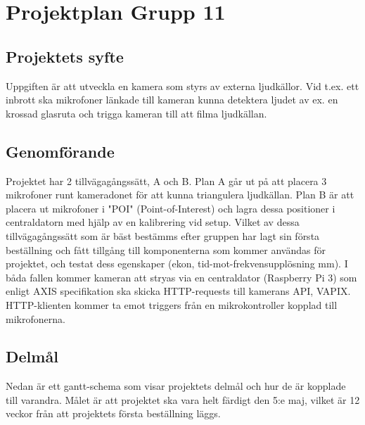 \documentclass[10pt]{article}
\begin{document}
\renewcommand\sfdefault{phv}
\renewcommand\mddefault{mc}
\renewcommand\bfdefault{bc}
\sffamily

\section*{\textbf{Projektplan Grupp 11}}

\subsection*{Projektets syfte}
Uppgiften är att utveckla en kamera som styrs av externa ljudkällor. Vid t.ex. ett inbrott ska mikrofoner länkade till kameran kunna detektera ljudet av
ex. en krossad glasruta och trigga kameran till att filma ljudkällan.
\subsection*{Genomförande}
Projektet har 2 tillvägagångssätt, A och B. Plan A går ut på att placera 3 mikrofoner runt kameradonet för att kunna triangulera ljudkällan.
Plan B är att placera ut mikrofoner i "POI" (Point-of-Interest) och lagra dessa positioner i centraldatorn med hjälp av en kalibrering vid setup.
Vilket av dessa tillvägagångssätt som är bäst bestämms efter gruppen har lagt sin första beställning och fått tillgång till komponenterna som kommer användas
för projektet, och testat dess egenskaper (ekon, tid-mot-frekvensupplösning mm). I båda fallen kommer kameran att stryas via en centraldator (Raspberry Pi 3)
som enligt AXIS specifikation ska skicka HTTP-requests till kamerans API, VAPIX. HTTP-klienten kommer ta emot triggers från en mikrokontroller kopplad till
mikrofonerna.
\pagebreak
\subsection*{Delmål}
Nedan är ett gantt-schema som visar projektets delmål och hur de är kopplade till varandra. Målet är att projektet ska vara helt färdigt den 5:e maj, vilket är
12 veckor från att projektets första beställning läggs.
\end{document}

